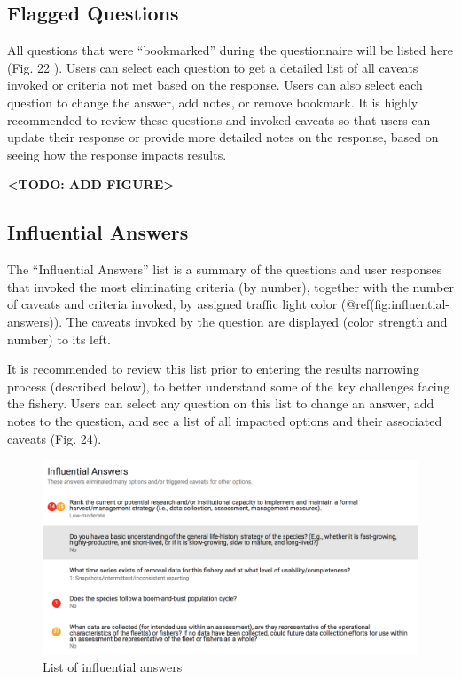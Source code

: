 \documentclass[11pt,]{book}
\begin{document}
\hypertarget{flagged-questions}{%
\subsection{Flagged Questions}\label{flagged-questions}}

All questions that were ``bookmarked'' during the questionnaire will be
listed here (Fig. 22 ). Users can select each question to get a detailed
list of all caveats invoked or criteria not met based on the response.
Users can also select each question to change the answer, add notes, or
remove bookmark. It is highly recommended to review these questions and
invoked caveats so that users can update their response or provide more
detailed notes on the response, based on seeing how the response impacts
results.

\textbf{\textless TODO: ADD FIGURE\textgreater{}}

\hypertarget{influential-answers}{%
\subsection{Influential Answers}\label{influential-answers}}

The ``Influential Answers'' list is a summary of the questions and user
responses that invoked the most eliminating criteria (by number),
together with the number of caveats and criteria invoked, by assigned
traffic light color (@ref(fig:influential-answers)). The caveats invoked
by the question are displayed (color strength and number) to its left.

It is recommended to review this list prior to entering the results
narrowing process (described below), to better understand some of the
key challenges facing the fishery. Users can select any question on this
list to change an answer, add notes to the question, and see a list of
all impacted options and their associated caveats (Fig. 24).

\begin{figure}

{\centering \includegraphics[width=0.95\linewidth]{images/influential-answers} 

}

\caption{List of influential answers}\label{fig:influential-answers}
\end{figure}
\end{document}
